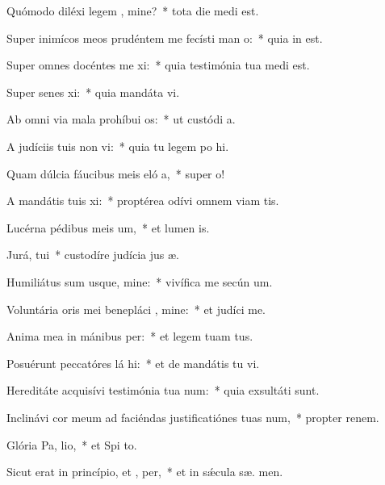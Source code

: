 \item Quómodo diléxi legem , mine?~* tota die medi  est.
\item Super inimícos meos prudéntem me fecísti man o:~* quia in   est.
\item Super omnes docéntes me xi:~* quia testimónia tua medi  est.
\item Super senes xi:~* quia mandáta  vi.
\item Ab omni via mala prohíbui  os:~* ut custódi  a.
\item A judíciis tuis non vi:~* quia tu legem po hi.
\item Quam dúlcia fáucibus meis eló a,~* super   o!
\item A mandátis tuis xi:~* proptérea odívi omnem viam tis.
\item Lucérna pédibus meis  um,~* et lumen  is.
\item Jurá,  tui~* custodíre judícia jus æ.
\item Humiliátus sum usque, mine:~* vivífica me secún  um.
\item Voluntária oris mei benepláci , mine:~* et judíci   me.
\item Anima mea in mánibus  per:~* et legem tuam   tus.
\item Posuérunt peccatóres lá hi:~* et de mandátis tu  vi.
\item Hereditáte acquisívi testimónia tua  num:~* quia exsultáti   sunt.
\item Inclinávi cor meum ad faciéndas justificatiónes tuas  num,~* propter renem.
\item Glória Pa,  lio,~* et Spi to.
\item Sicut erat in princípio, et ,  per,~* et in sǽcula sæ. men.
